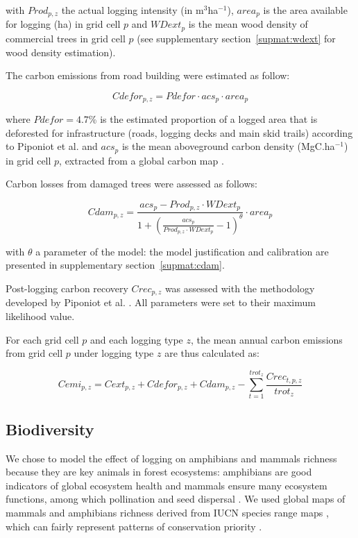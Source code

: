 \documentclass{article}
\begin{document}
with $Prod_{p,z}$ the actual logging intensity (in m$^3$ha$^{-1}$), $area_p$ is the area available for logging (ha) in grid cell $p$ and $WDext_p$ is the mean wood density of commercial trees in grid cell $p$ (see supplementary section~\ref{supmat:wdext} for wood density estimation). 

The carbon emissions from road building were estimated as follow: 

\begin{equation}
\label{eq:croad}
    Cdefor_{p,z} = Pdefor \cdot acs_p \cdot area_p
\end{equation}

where $Pdefor = 4.7 $\% is the estimated proportion of a logged area that is deforested for infrastructure (roads, logging decks and main skid trails) according to Piponiot et al. \cite{Piponiot2016} and $acs_p$ is the mean aboveground carbon density (MgC.ha$^{-1}$) in grid cell $p$, extracted from a global carbon map \cite{Avitabile2016}. 

Carbon losses from damaged trees were assessed as follows: 

\begin{equation}
\label{eq:cdam}
    Cdam_{p,z} = \frac{acs_p  - Prod_{p,z} \cdot WDext_p } {1 + \left(\frac{acs_p}{Prod_{p,z} \cdot WDext_p}  -1 \right)^\theta} \cdot area_p
\end{equation}

with $\theta$ a parameter of the model: the model justification and calibration are presented in supplementary section~\ref{supmat:cdam}. 

Post-logging carbon recovery $Crec_{p,z}$ was assessed with the methodology developed by Piponiot et al. \cite{Piponiot2016a}.  
All parameters were set to their maximum likelihood value. 

For each grid cell $p$ and each logging type $z$, the mean annual carbon emissions from grid cell $p$ under logging type $z$ are thus calculated as: 

\begin{equation}
\label{eq:cemi}
    Cemi_{p,z} = Cext_{p,z} + Cdefor_{p,z} + Cdam_{p,z} -  \sum_{t=1}^{trot_z} \frac{Crec_{t,p,z}}{trot_z} 
\end{equation}

\subsection{Biodiversity}

We chose to model the effect of logging on amphibians and mammals richness because they are key animals in forest ecosystems: amphibians are good indicators of global ecosystem health \cite{Welsh1998,Collins2003} and mammals ensure many ecosystem functions, among which pollination \cite{Fleming2009} and seed dispersal \cite{Wright2000,Muscarella2007}. We used global maps of mammals and amphibians richness derived from IUCN species range maps \cite{Jenkins2013,MapBiodiv}, which can fairly represent patterns of conservation priority \cite{Marechaux2017}.
\end{document}
